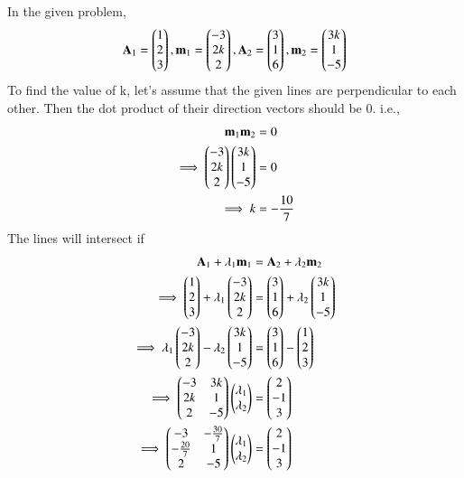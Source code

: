 In the given problem,
\begin{align}
	\mathbf{A}_1 = \begin{pmatrix}1 \\ 2 \\ 3\end{pmatrix}, \mathbf{m}_1 = \begin{pmatrix}-3\\ 2k\\ 2\end{pmatrix}, \mathbf{A}_2 = \begin{pmatrix}3\\ 1 \\ 6\end{pmatrix}, \mathbf{m}_2 = \begin{pmatrix}3k \\ 1 \\ -5\end{pmatrix}
\end{align}
To find the value of k, let's assume that the given lines are perpendicular to each other. Then the dot product of their direction vectors should be 0. i.e.,
\begin{align}
	\mathbf{m}_1 \mathbf{m}_2 &= 0\\
	\implies \begin{pmatrix}-3\\ 2k\\ 2\end{pmatrix} \begin{pmatrix}3k \\ 1 \\ -5\end{pmatrix} &= 0\\
	\implies k &= -\frac{10}{7}
\end{align}
The lines will intersect if 
\begin{align}
\mathbf{A}_1 + \lambda_1 \mathbf{m}_1 &= \mathbf{A}_2 + \lambda_2 \mathbf{m}_2 \\
\implies \begin{pmatrix}1 \\ 2 \\ 3\end{pmatrix} + \lambda_1\begin{pmatrix}-3\\ 2k\\ 2\end{pmatrix} &= \begin{pmatrix}3\\ 1 \\ 6\end{pmatrix} + \lambda_2\begin{pmatrix}3k \\ 1 \\ -5\end{pmatrix}\\
\implies \lambda_1\begin{pmatrix}-3\\ 2k\\ 2\end{pmatrix} - \lambda_2\begin{pmatrix}3k \\ 1 \\ -5\end{pmatrix} &= \begin{pmatrix}3\\ 1 \\ 6\end{pmatrix}  - \begin{pmatrix}1 \\ 2 \\ 3\end{pmatrix}\\
\implies \begin{pmatrix}-3 & 3k \\ 2k & 1\\ 2 & -5\end{pmatrix} \begin{pmatrix}\lambda_1 \\ \lambda_2\end{pmatrix} &= \begin{pmatrix}2 \\ -1 \\ 3\end{pmatrix}\\
\implies \begin{pmatrix}-3 & -\frac{30}{7} \\ -\frac{20}{7} & 1\\ 2 & -5\end{pmatrix} \begin{pmatrix}\lambda_1 \\ \lambda_2\end{pmatrix} &= \begin{pmatrix}2 \\ -1 \\ 3\end{pmatrix} \label{eq:solutions/3/9/eql1l2}
\end{align}
